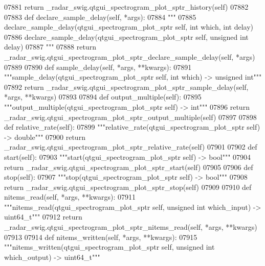 \begin{DoxyCode}
{{{{{{{{{{{{{{{{{{{{{{{{{{07881         \textcolor{keywordflow}{return} \_radar\_swig.qtgui\_spectrogram\_plot\_sptr\_history(self)
07882 
07883     \textcolor{keyword}{def }declare_sample_delay(self, *args):
07884         \textcolor{stringliteral}{"""}
07885 \textcolor{stringliteral}{        declare\_sample\_delay(qtgui\_spectrogram\_plot\_sptr self, int which, int delay)}
07886 \textcolor{stringliteral}{        declare\_sample\_delay(qtgui\_spectrogram\_plot\_sptr self, unsigned int delay)}
07887 \textcolor{stringliteral}{        """}
07888         \textcolor{keywordflow}{return} \_radar\_swig.qtgui\_spectrogram\_plot\_sptr\_declare\_sample\_delay(self, *args)
07889 
07890     \textcolor{keyword}{def }sample_delay(self, *args, **kwargs):
07891         \textcolor{stringliteral}{"""sample\_delay(qtgui\_spectrogram\_plot\_sptr self, int which) -> unsigned int"""}
07892         \textcolor{keywordflow}{return} \_radar\_swig.qtgui\_spectrogram\_plot\_sptr\_sample\_delay(self, *args, **kwargs)
07893 
07894     \textcolor{keyword}{def }output_multiple(self):
07895         \textcolor{stringliteral}{"""output\_multiple(qtgui\_spectrogram\_plot\_sptr self) -> int"""}
07896         \textcolor{keywordflow}{return} \_radar\_swig.qtgui\_spectrogram\_plot\_sptr\_output\_multiple(self)
07897 
07898     \textcolor{keyword}{def }relative_rate(self):
07899         \textcolor{stringliteral}{"""relative\_rate(qtgui\_spectrogram\_plot\_sptr self) -> double"""}
07900         \textcolor{keywordflow}{return} \_radar\_swig.qtgui\_spectrogram\_plot\_sptr\_relative\_rate(self)
07901 
07902     \textcolor{keyword}{def }start(self):
07903         \textcolor{stringliteral}{"""start(qtgui\_spectrogram\_plot\_sptr self) -> bool"""}
07904         \textcolor{keywordflow}{return} \_radar\_swig.qtgui\_spectrogram\_plot\_sptr\_start(self)
07905 
07906     \textcolor{keyword}{def }stop(self):
07907         \textcolor{stringliteral}{"""stop(qtgui\_spectrogram\_plot\_sptr self) -> bool"""}
07908         \textcolor{keywordflow}{return} \_radar\_swig.qtgui\_spectrogram\_plot\_sptr\_stop(self)
07909 
07910     \textcolor{keyword}{def }nitems_read(self, *args, **kwargs):
07911         \textcolor{stringliteral}{"""nitems\_read(qtgui\_spectrogram\_plot\_sptr self, unsigned int which\_input) -> uint64\_t"""}
07912         \textcolor{keywordflow}{return} \_radar\_swig.qtgui\_spectrogram\_plot\_sptr\_nitems\_read(self, *args, **kwargs)
07913 
07914     \textcolor{keyword}{def }nitems_written(self, *args, **kwargs):
07915         \textcolor{stringliteral}{"""nitems\_written(qtgui\_spectrogram\_plot\_sptr self, unsigned int which\_output) -> uint64\_t"""}
}}}}}}}}}}}}}}}}}}}}}}}}}}
\end{DoxyCode}

